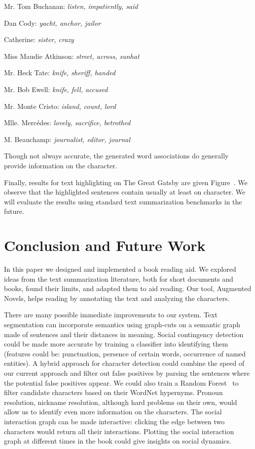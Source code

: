 \documentclass[twoside]{article}
\makeatletter
\let\ref\@refstar
\makeatother
\begin{document}
\begin{multicols}{2}
Mr. Tom Buchanan: \emph{listen, impatiently, said}

Dan Cody: \emph{yacht, anchor, jailor}

Catherine: \emph{sister, crazy}

\underline{}

Miss Maudie Atkinson: \emph{street, across, sunhat}

Mr. Heck Tate: \emph{knife, sheriff, handed}

Mr. Bob Ewell: \emph{knife, fell, accused}

\underline{}

Mr. Monte Cristo: \emph{island, count, lord}

Mlle. Merc\'edes: \emph{lovely, sacrifice, betrothed}

M. Beauchamp: \emph{journalist, editor, journal}

\vspace{1ex}

Though not always accurate, the generated word associations do generally provide information on the character. 

Finally, results for text highlighting on The Great Gatsby are given Figure~\ref{figure:highlight}. We observe that the highlighted sentences contain usually at least on character. We will evaluate the results using standard text summarization benchmarks in the future.


\section{Conclusion and Future Work}

In this paper we designed and implemented a book reading aid. We explored ideas from the text summarization literature, both for short documents and books, found their limits, and adapted them to aid reading. Our tool, Augmented Novels, helps reading by annotating the text and analyzing the characters. 

There are many possible immediate improvements to our system. Text segmentation can incorporate semantics using graph-cuts on a semantic graph made of sentences and their distances in meaning. Social contingency detection could be made more accurate by training a classifier into identifying them (features could be: punctuation, persence of certain words, occurrence of named entities). A hybrid approach for character detection could combine the speed of our current approach and filter out false positives by parsing the sentences where the potential false positives appear. We could also train a Random Forest~\cite{breiman2001random} to filter candidate characters based on their WordNet hypernyms. Pronoun resolution, nickname resolution, although hard problems on their own, would allow us to identify even more information on the characters. The social interaction graph can be made interactive: clicking the edge between two characters would return all their interactions. Plotting the social interaction graph at different times in the book could give insights on social dynamics.


\end{multicols}
\end{document}
